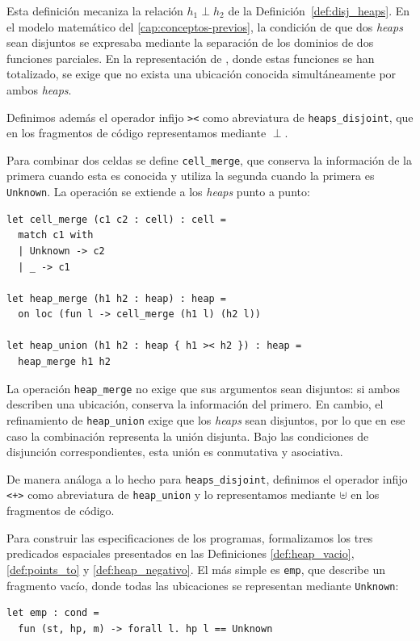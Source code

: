 \documentclass[a4paper,	11pt]{report}
\begin{document}
Esta definición mecaniza la relación $h_1 \perp h_2$ de la Definición~\ref{def:disj_heaps}.
En el modelo matemático del \autoref{cap:conceptos-previos},
la condición de que dos \emph{heaps} sean disjuntos se expresaba mediante la separación de los dominios de dos funciones parciales.
En la representación de \fstar{},
donde estas funciones se han totalizado,
se exige que no exista una ubicación conocida simultáneamente por ambos \emph{heaps}.

Definimos además el operador infijo \texttt{><} como abreviatura de \lstinline|heaps_disjoint|,
que en los fragmentos de código representamos mediante $\perp$.

Para combinar dos celdas se define \lstinline|cell_merge|,
que conserva la información de la primera cuando esta es conocida y utiliza la segunda cuando la primera es \lstinline|Unknown|.
La operación se extiende a los \emph{heaps} punto a punto:

\begin{lstlisting}
let cell_merge (c1 c2 : cell) : cell =
  match c1 with
  | Unknown -> c2
  | _ -> c1

let heap_merge (h1 h2 : heap) : heap =
  on loc (fun l -> cell_merge (h1 l) (h2 l))

let heap_union (h1 h2 : heap { h1 >< h2 }) : heap =
  heap_merge h1 h2
\end{lstlisting}

La operación \lstinline|heap_merge| no exige que sus argumentos sean disjuntos:
si ambos describen una ubicación,
conserva la información del primero.
En cambio,
el refinamiento de \lstinline|heap_union| exige que los \emph{heaps} sean disjuntos,
por lo que en ese caso la combinación representa la unión disjunta.
Bajo las condiciones de disjunción correspondientes,
esta unión es conmutativa y asociativa.

De manera análoga a lo hecho para \lstinline|heaps_disjoint|,
definimos el operador infijo \texttt{<+>} como abreviatura de \lstinline|heap_union| y lo representamos mediante $\uplus$ en los fragmentos de código.

Para construir las especificaciones de los programas,
formalizamos los tres predicados espaciales presentados en las Definiciones \ref{def:heap_vacio},
\ref{def:points_to} y \ref{def:heap_negativo}.
El más simple es \lstinline|emp|,
que describe un fragmento vacío,
donde todas las ubicaciones se representan mediante \lstinline|Unknown|:

\begin{lstlisting}
let emp : cond =
  fun (st, hp, m) -> forall l. hp l == Unknown
\end{lstlisting}
\end{document}

